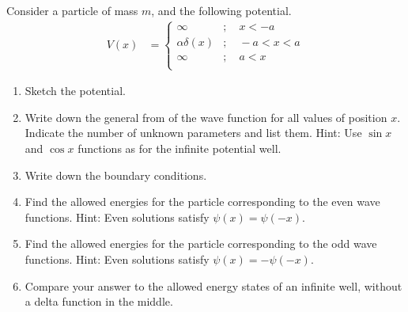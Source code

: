 \documentclass[fleqn, a4paper, 11pt, oneside]{amsart}
\theoremstyle{definition}
\theoremstyle{theorem}
\begin{document}
\begin{question}
	Consider a particle of mass $m$, and the following potential.
	\begin{align*}
		V(x) &=
			\begin{cases}
				\infty &;\quad x < -a\\
				\alpha \delta(x) &;\quad -a < x < a\\
				\infty &;\quad a < x\\
			\end{cases}
	\end{align*}
	\begin{enumerate}
		\item
			Sketch the potential.
		\item
			Write down the general from of the wave function for all values of position $x$.
			Indicate the number of unknown parameters and list them.
			Hint: Use $\sin x$ and $\cos x$ functions as for the infinite potential well.
		\item
			Write down the boundary conditions.
		\item
			Find the allowed energies for the particle corresponding to the even wave functions.
			Hint: Even solutions satisfy $\psi(x) = \psi(-x)$.
		\item
			Find the allowed energies for the particle corresponding to the odd wave functions.
			Hint: Even solutions satisfy $\psi(x) = -\psi(-x)$.
		\item
			Compare your answer to the allowed energy states of an infinite well, without a delta function in the middle.
	\end{enumerate}
\end{question}
\end{document}
